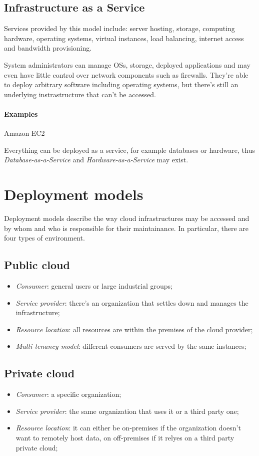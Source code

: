 \subsection{Infrastructure as a Service}
Services provided by this model include: server hosting, storage, computing
hardware, operating systems, virtual instances, load balancing, internet access
and bandwidth provisioning.

System administrators can manage OSs, storage, deployed applications and may
even have little control over network components such as firewalls. They're
able to deploy arbitrary software including operating systems, but there's
still an underlying instrastructure that can't be accessed.

\paragraph{Examples} Amazon EC2

\begin{note}
    Everything can be deployed as a service, for example databases or hardware,
    thus \emph{Database-as-a-Service} and \emph{Hardware-as-a-Service} may
    exist.
\end{note}

\section{Deployment models}
Deployment models describe the way cloud infrastructures may be accessed
and by whom and who is responsible for their maintainance. In particular,
there are four types of environment.

\subsection{Public cloud}
\begin{itemize}
    \item \emph{Consumer}: general users or large industrial groups;
    \item \emph{Service provider}: there's an organization that settles down
    and manages the infrastructure;
    \item \emph{Resource location}: all resources are within the premises of the
    cloud provider;
    \item \emph{Multi-tenancy model}: different consumers are served by the same
    instances;
\end{itemize}

\subsection{Private cloud}
\begin{itemize}
    \item \emph{Consumer}: a specific organization;
    \item \emph{Service provider}: the same organization that uses it or a third
    party one;
    \item \emph{Resource location}: it can either be on-premises if the organization
    doesn't want to remotely host data, on off-premises if it relyes on a third
    party private cloud;
\end{itemize}

